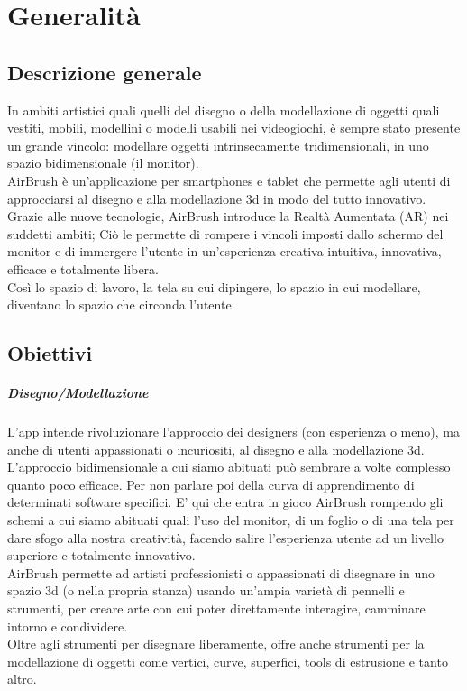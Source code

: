 \documentclass[11pt,fleqn]{book} %
\begin{document}


\chapter{Generalità}

\section{Descrizione generale}
In ambiti artistici quali quelli del disegno o della modellazione di oggetti quali vestiti, mobili, modellini o modelli usabili nei videogiochi, è sempre stato presente un grande vincolo: modellare oggetti intrinsecamente tridimensionali, in uno spazio bidimensionale (il monitor).\\
AirBrush è un'applicazione per smartphones e tablet che permette agli utenti di approcciarsi al disegno e alla modellazione 3d in modo del tutto innovativo. \\
Grazie alle nuove tecnologie, AirBrush introduce la Realtà Aumentata (AR) nei suddetti ambiti; Ciò le permette di rompere i vincoli imposti dallo schermo del monitor e di immergere l'utente in un'esperienza creativa intuitiva, innovativa, efficace e totalmente libera.\\
Così lo spazio di lavoro, la tela su cui dipingere, lo spazio in cui modellare, diventano lo spazio che circonda l'utente.

\section{Obiettivi}
\paragraph{Disegno/Modellazione} L'app intende rivoluzionare l'approccio dei designers (con esperienza o meno), ma anche di utenti appassionati o incuriositi, al disegno e alla modellazione 3d. \\
L'approccio bidimensionale a cui siamo abituati può sembrare a volte complesso quanto poco efficace. Per non parlare poi della curva di apprendimento di determinati software specifici. E' qui che entra in gioco AirBrush rompendo gli schemi a cui siamo abituati quali l'uso del monitor, di un foglio o di una tela per dare sfogo alla nostra creatività, facendo salire l'esperienza utente ad un livello superiore e totalmente innovativo.\\
AirBrush permette ad artisti professionisti o appassionati di disegnare in uno spazio 3d (o nella propria stanza) usando un'ampia varietà di pennelli e strumenti, per creare arte con cui poter direttamente interagire, camminare intorno e condividere.\\
Oltre agli strumenti per disegnare liberamente, offre anche strumenti per la modellazione di oggetti come vertici, curve, superfici, tools di estrusione e tanto altro.
\end{document}
